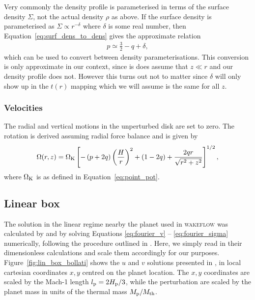 Very commonly the density profile is parameterised in terms of the surface density $\Sigma$, not the actual density $\rho$ as above.
If the surface density is parameterised as $\Sigma \propto r^{-\delta}$ where $\delta$ is some real number, then Equation~\eqref{eq:surf_dens_to_dens} gives the approximate relation 
\begin{align}
    p \simeq \frac{3}{2} - q + \delta,
\end{align}
which can be used to convert between density parameterisations.
This conversion is only approximate in our context, since is does assume that $z \ll r$ and our density profile does not.
However this turns out not to matter since $\delta$ will only show up in the $t(r)$ mapping which we will assume is the same for all $z$.

\subsubsection{Velocities}

The radial and vertical motions in the unperturbed disk are set to zero. 
The rotation is derived assuming radial force balance \citep[e.g.][]{nelson2013} and is given by 
\begin{align}
    \Omega(r,z) = \Omega_{\rm K} \left[ - \left(p + 2q\right) \left( \frac{H}{r} \right)^2 + \left( 1-2q \right) + \frac{2qr}{\sqrt{r^2 + z^2}}\right]^{1/2}, \label{eq:omega_wf_ps}
\end{align}
where $\Omega_{\rm K}$ is as defined in Equation~\eqref{eq:point_pot}.

\subsection{Linear box} \label{sec:linear_box}

The solution in the linear regime nearby the planet used in \textsc{wakeflow} was calculated by \citet{bollati2020} and \citet{bollati2021} by solving Equations \eqref{eq:fourier_v} -- \eqref{eq:fourier_sigma} numerically, following the procedure outlined in \citet{goodman2001}.
Here, we simply read in their dimensionless calculations and scale them accordingly for our purposes. Figure~\ref{fig:lin_box_bollati} shows the $u$ and $v$ solutions presented in \citet{bollati2021}, in local cartesian coordinates $x,y$ centred on the planet location.
The $x,y$ coordinates are scaled by the Mach-1 length $l_{\rm p} = 2H_{\rm p}/3$, while the perturbation are scaled by the planet mass in units of the thermal mass $M_{\rm p} / M_{\rm th}$.

